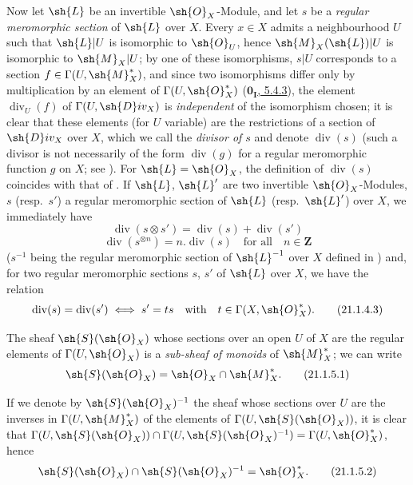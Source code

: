\begin{env}[21.1.4]
\label{IV.21.1.4}
Now let $\sh{L}$ be an invertible $\sh{O}_X$-Module, and let $s$ be a \emph{regular meromorphic section}  of $\sh{L}$ over $X$.
Every $x\in X$ admits a neighbourhood $U$ such that $\sh{L}|U$ is isomorphic to $\sh{O}_U$, hence $\sh{M}_X(\sh{L})|U$ is isomorphic to $\sh{M}_X|U$;
by one of these isomorphisms, $s|U$ corresponds to a section $f\in\Gamma(U,\sh{M}_X^*)$, and since two isomorphisms differ only by multiplication by an element of $\Gamma(U,\sh{O}_X^*)$ (\hyperref[0.5.4.3]{$\mathbf{0_I}$, 5.4.3}), the element $\operatorname{div}_U(f)$ of $\Gamma(U,\sh{D}iv_X)$ is \emph{independent} of the isomorphism chosen;
it is clear that these elements (for $U$ variable) are the restrictions of a section of $\sh{D}iv_X$ over $X$, which we call the \emph{divisor of $s$} and denote $\operatorname{div}(s)$ (such a divisor is not necessarily of the form $\operatorname{div}(g)$ for a regular meromorphic function $g$ on $X$;
see ).
For $\sh{L}=\sh{O}_X$, the definition of $\operatorname{div}(s)$ coincides with that of .
If $\sh{L}$, $\sh{L}'$ are two invertible $\sh{O}_X$-Modules, $s$ (resp.\ $s'$) a regular meromorphic section of $\sh{L}$ (resp.\ $\sh{L}'$) over $X$, we immediately have
\[
\label{IV.21.1.4.1}
  \operatorname{div}(s\otimes s')=\operatorname{div}(s)+\operatorname{div}(s')
  \tag{21.1.4.1}
\]
\[
\label{IV.21.1.4.2}
  \operatorname{div}(s^{\otimes n})=n.\operatorname{div}(s) \quad\text{for all}\quad n\in\mathbf{Z}
  \tag{21.1.4.2}
\]
($s^{-1}$ being the regular meromorphic section of $\sh{L}^{-1}$ over $X$ defined in )
and, for two regular meromorphic sections $s$, $s'$ of $\sh{L}$ over $X$, we have the relation
\[
\label{IV.21.1.4.3}
  \operatorname{div}(s)=\operatorname{div}(s') \iff s'=ts \quad\text{with}\quad t\in\Gamma(X,\sh{O}_X^*).
  \tag{21.1.4.3}
\]
\end{env}

\begin{env}[21.1.5]
\label{IV.21.1.5}
The sheaf $\sh{S}(\sh{O}_X)$  whose sections over an open $U$ of $X$ are the regular elements of $\Gamma(U,\sh{O}_X)$ is a \emph{sub-sheaf of monoids} of $\sh{M}_X^*$;
we can write
\[
\label{IV.21.1.5.1}
  \sh{S}(\sh{O}_X)=\sh{O}_X\cap\sh{M}_X^*.
  \tag{21.1.5.1}
\]
\end{env}


If we denote by $\sh{S}(\sh{O}_X)^{-1}$ the sheaf whose sections over $U$ are the inverses in $\Gamma(U,\sh{M}_X^*)$ of the elements of $\Gamma(U,\sh{S}(\sh{O}_X))$, it is clear that $\Gamma(U,\sh{S}(\sh{O}_X))\cap\Gamma(U,\sh{S}(\sh{O}_X)^{-1})=\Gamma(U,\sh{O}_X^*)$, hence
\[
\label{IV.21.1.5.2}
  \sh{S}(\sh{O}_X)\cap\sh{S}(\sh{O}_X)^{-1}=\sh{O}_X^*.
  \tag{21.1.5.2}
\]

